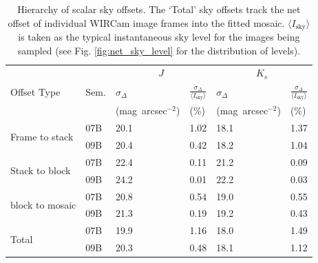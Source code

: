 \documentclass[iop]{emulateapj}
\begin{document}
\begin{table}[t]
    \centering
    \caption[Hierarchy of scalar sky offsets]{Hierarchy of scalar sky offsets. The `Total' sky offsets track the net offset of individual WIRCam image frames into the fitted mosaic. $\langle I_\mathrm{sky}\rangle$ is taken as the typical instantaneous sky level for the images being sampled (see Fig. \ref{fig:net_sky_level} for the distribution of levels).}
    \label{tab:offset_hierarchy}
\begin{tabular}{ll|ll|ll}
 &  & \multicolumn{2}{c|}{$J$} & \multicolumn{2}{c}{$K_s$} \\ %
Offset Type & Sem. & $\sigma_\Delta$ & $\frac{\sigma_\Delta}{\langle I_\mathrm{sky}\rangle }$ & $\sigma_\Delta$ & $\frac{\sigma_\Delta}{\langle I_\mathrm{sky}\rangle }$ \\
 & & \tiny{(mag~arcsec$^{-2}$)} &  \tiny{(\%)} & \tiny{(mag~arcsec$^{-2}$)} &  \tiny{(\%)} \\
\hline
\multirow{2}{*}{Frame to stack} & 07B & 20.1 & 1.02 & 18.1 & 1.37 \\
 & 09B  & 20.4 & 0.42 & 18.2 & 1.04 \\
\hline
\multirow{2}{*}{Stack to block} & 07B & 22.4 & 0.11 & 21.2 & 0.09 \\
  & 09B & 24.2 & 0.01 & 22.2 & 0.03\\
\hline
\multirow{2}{*}{block to mosaic} & 07B & 20.8 & 0.54 & 19.0 & 0.55 \\
  & 09B & 21.3 & 0.19 & 19.2 & 0.43 \\
\hline
\multirow{2}{*}{Total} & 07B & 19.9 & 1.16 & 18.0 & 1.49 \\
  & 09B & 20.3 & 0.48 & 18.1 & 1.12 \\
\end{tabular}
\end{table}

% 
% 
% 
% 
% 
% 
\end{document}
